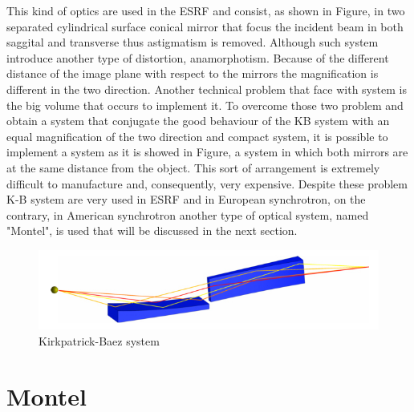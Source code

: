 \hspace{10mm} This kind of optics are used in the ESRF and consist, as shown in Figure, in two separated cylindrical surface conical mirror that focus the incident beam in both saggital and transverse thus astigmatism is removed. Although such system introduce another type of distortion, anamorphotism. Because of the different distance of the image plane with respect to the mirrors the magnification is different in the two direction.  Another technical problem that face with system is the big volume that occurs to implement it.
\noindent To overcome those two problem and obtain a system that conjugate the good behaviour of the KB system with an equal magnification of the two direction and compact system, it is possible to implement a system as it is showed in Figure, a system in which both mirrors are at the same distance from the object. This sort of arrangement is extremely difficult to manufacture and, consequently, very expensive.
\noindent Despite these problem K-B system are very used in ESRF and in European synchrotron, on the contrary, in American synchrotron another type of optical system, named "Montel", is used that will be discussed in the next section.
\begin{figure}[H]
%
\centering
%
\includegraphics[width=.6\textwidth]{Immagini/Chapter2/KBSystem}
%
\caption{Kirkpatrick-Baez system}
%
\label{fig: SurfaceConic1}
%
\end{figure}


\section{Montel}

